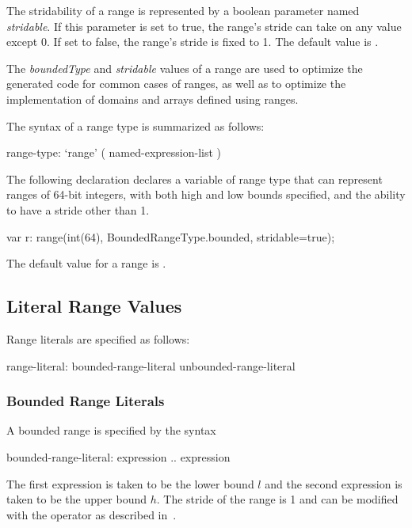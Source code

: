 The stridability of a range is represented by a boolean parameter
named \emph{stridable}.  If this parameter is set to true, the range's
stride can take on any  value except 0.  If set to false,
the range's stride is fixed to 1.  The default value is .

\begin{rationale}
The \emph{boundedType} and \emph{stridable} values of a range are used
to optimize the generated code for common cases of ranges, as well as
to optimize the implementation of domains and arrays defined using
ranges.
\end{rationale}

The syntax of a range type is summarized as follows:
\begin{syntax}
range-type:
  `range' ( named-expression-list )
\end{syntax}

\begin{example}
The following declaration declares a variable 
of range type that can represent ranges of 64-bit integers, with both
high and low bounds specified, and the ability to have a stride other
than 1.
\begin{chapel}
var r: range(int(64), BoundedRangeType.bounded, stridable=true);
\end{chapel}
\end{example}

The default value for a range is .

\subsection{Literal Range Values}
\label{Range_Literals}

Range literals are specified as follows:
\begin{syntax}
range-literal:
  bounded-range-literal
  unbounded-range-literal
\end{syntax}

\subsubsection{Bounded Range Literals}
\label{Bounded_Ranges}

A bounded range is specified by the syntax
\begin{syntax}
bounded-range-literal:
  expression .. expression
\end{syntax}
The first expression is taken to be the lower bound $l$ and the second
expression is taken to be the upper bound $h$.  The stride of the
range is 1 and can be modified with the  operator as described
in~.

